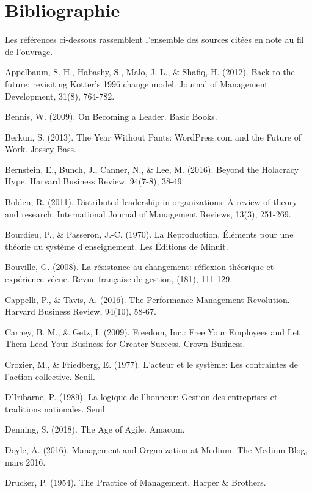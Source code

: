 \part*{Bibliographie}
\markboth{}{}

Les références ci-dessous rassemblent l'ensemble des sources citées en note au fil de l'ouvrage.

\begingroup
\setlength{\parindent}{-1.5em}
\setlength{\leftskip}{1.5em}

Appelbaum, S. H., Habashy, S., Malo, J. L., \& Shafiq, H. (2012). Back to the future: revisiting Kotter's 1996 change model. Journal of Management Development, 31(8), 764-782.

Bennis, W. (2009). On Becoming a Leader. Basic Books.

Berkun, S. (2013). The Year Without Pants: WordPress.com and the Future of Work. Jossey-Bass.

Bernstein, E., Bunch, J., Canner, N., \& Lee, M. (2016). Beyond the Holacracy Hype. Harvard Business Review, 94(7-8), 38-49.

Bolden, R. (2011). Distributed leadership in organizations: A review of theory and research. International Journal of Management Reviews, 13(3), 251-269.

Bourdieu, P., \& Passeron, J.-C. (1970). La Reproduction. Éléments pour une théorie du système d'enseignement. Les Éditions de Minuit.

Bouville, G. (2008). La résistance au changement: réflexion théorique et expérience vécue. Revue française de gestion, (181), 111-129.

Cappelli, P., \& Tavis, A. (2016). The Performance Management Revolution. Harvard Business Review, 94(10), 58-67.

Carney, B. M., \& Getz, I. (2009). Freedom, Inc.: Free Your Employees and Let Them Lead Your Business for Greater Success. Crown Business.

Crozier, M., \& Friedberg, E. (1977). L'acteur et le système: Les contraintes de l'action collective. Seuil.

D'Iribarne, P. (1989). La logique de l'honneur: Gestion des entreprises et traditions nationales. Seuil.

Denning, S. (2018). The Age of Agile. Amacom.

Doyle, A. (2016). Management and Organization at Medium. The Medium Blog, mars 2016.

Drucker, P. (1954). The Practice of Management. Harper \& Brothers.

